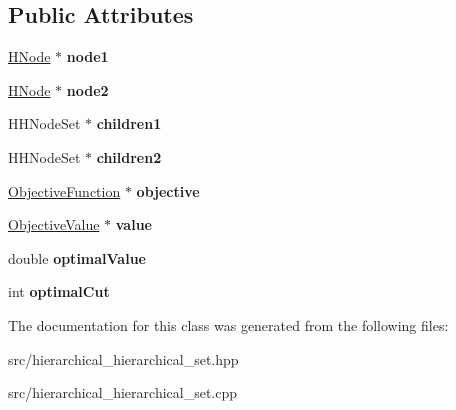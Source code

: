 \subsection*{Public Attributes}
\begin{DoxyCompactItemize}
\item 
\hypertarget{classHHNode_a8a4840e3b550450038aa6cf08664a10f}{\hyperlink{classHNode}{H\-Node} $\ast$ {\bfseries node1}}\label{classHHNode_a8a4840e3b550450038aa6cf08664a10f}

\item 
\hypertarget{classHHNode_a27dca34d04c73268088acaa3f63c3cf1}{\hyperlink{classHNode}{H\-Node} $\ast$ {\bfseries node2}}\label{classHHNode_a27dca34d04c73268088acaa3f63c3cf1}

\item 
\hypertarget{classHHNode_a30f76c1b6af3e718fed25daf3f201867}{H\-H\-Node\-Set $\ast$ {\bfseries children1}}\label{classHHNode_a30f76c1b6af3e718fed25daf3f201867}

\item 
\hypertarget{classHHNode_ae834d94db3d05c0611cae96b65310a3f}{H\-H\-Node\-Set $\ast$ {\bfseries children2}}\label{classHHNode_ae834d94db3d05c0611cae96b65310a3f}

\item 
\hypertarget{classHHNode_a699ca440cd845b1605ac39da167a3ef6}{\hyperlink{classObjectiveFunction}{Objective\-Function} $\ast$ {\bfseries objective}}\label{classHHNode_a699ca440cd845b1605ac39da167a3ef6}

\item 
\hypertarget{classHHNode_ae38edb82e59ed2a8265212861234bb86}{\hyperlink{classObjectiveValue}{Objective\-Value} $\ast$ {\bfseries value}}\label{classHHNode_ae38edb82e59ed2a8265212861234bb86}

\item 
\hypertarget{classHHNode_a95b0f06e417e1805649993b1105c0353}{double {\bfseries optimal\-Value}}\label{classHHNode_a95b0f06e417e1805649993b1105c0353}

\item 
\hypertarget{classHHNode_a4f9897665bc4098b16432f619cbb4545}{int {\bfseries optimal\-Cut}}\label{classHHNode_a4f9897665bc4098b16432f619cbb4545}

\end{DoxyCompactItemize}


The documentation for this class was generated from the following files\-:\begin{DoxyCompactItemize}
\item 
src/hierarchical\-\_\-hierarchical\-\_\-set.\-hpp\item 
src/hierarchical\-\_\-hierarchical\-\_\-set.\-cpp\end{DoxyCompactItemize}
